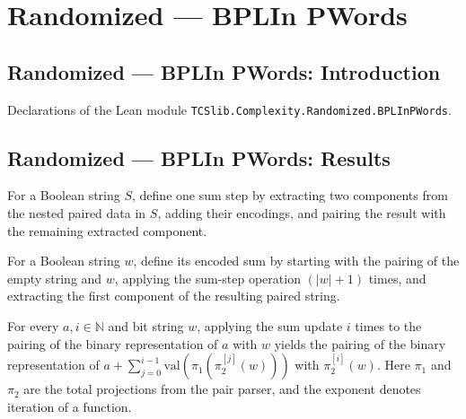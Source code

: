 \section{Randomized --- BPLIn PWords}
\subsection*{Randomized --- BPLIn PWords: Introduction}

Declarations of the Lean module \texttt{TCSlib.Complexity.Randomized.BPLInPWords}.

\subsection*{Randomized --- BPLIn PWords: Results}

\begin{definition}
\label{Randomized.BPLInP.sumStep}
\leanok
{}
For a Boolean string $S$, define one sum step by extracting two components from the
nested paired data in $S$, adding their encodings, and pairing the result with the
remaining extracted component.
\end{definition}

\begin{definition}
\label{Randomized.BPLInP.sumW}
\leanok
{}
For a Boolean string $w$, define its encoded sum by starting with the pairing of the
empty string and $w$, applying the sum-step operation $(|w|+1)$ times, and extracting
the first component of the resulting paired string.
\end{definition}

\begin{theorem}
\label{Randomized.BPLInP.iterate_sumStep}
\leanok
{}
For every $a,i\in\mathbb N$ and bit string $w$, applying the sum update $i$ times to the
pairing of the binary representation of $a$ with $w$ yields the pairing of the binary
representation of $a+\sum_{j=0}^{i-1}\mathrm{val}(\pi_1(\pi_2^{[j]}(w)))$ with
$\pi_2^{[i]}(w)$. Here $\pi_1$ and $\pi_2$ are the total projections from the pair
parser, and the exponent denotes iteration of a function.
\end{theorem}

